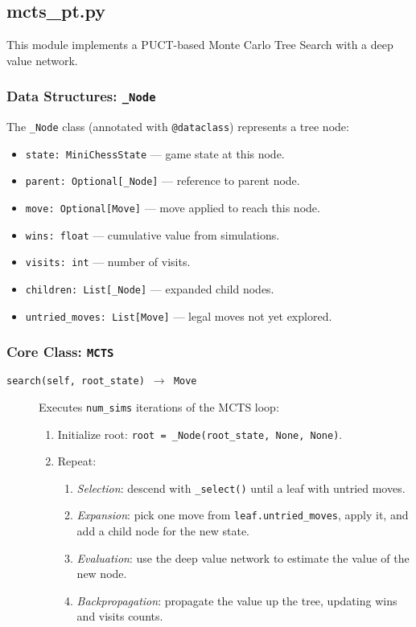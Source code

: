 \documentclass{report}
\begin{document}
\subsection{mcts\_pt.py}
\label{sec:mcts_pt}
This module implements a PUCT-based Monte Carlo Tree Search with a deep value network.

\subsubsection{Data Structures: \texttt{\_Node}}
The \texttt{\_Node} class (annotated with \texttt{@dataclass}) represents a tree node:
\begin{itemize}
  \item \texttt{state: MiniChessState} — game state at this node.
  \item \texttt{parent: Optional[\_Node]} — reference to parent node.
  \item \texttt{move: Optional[Move]} — move applied to reach this node.
  \item \texttt{wins: float} — cumulative value from simulations.
  \item \texttt{visits: int} — number of visits.
  \item \texttt{children: List[\_Node]} — expanded child nodes.
  \item \texttt{untried\_moves: List[Move]} — legal moves not yet explored.
\end{itemize}

\subsubsection{Core Class: \texttt{MCTS}}
\begin{description}
  \item[\texttt{search(self, root\_state) $\to$ Move}] 
    Executes \texttt{num\_sims} iterations of the MCTS loop:
    \begin{enumerate}
      \item Initialize root: \texttt{root = \_Node(root\_state, None, None)}.
      \item Repeat:
        \begin{enumerate}
          \item \emph{Selection}: descend with \texttt{\_select()} until a leaf with untried moves.
          \item \emph{Expansion}: pick one move from \texttt{leaf.untried\_moves}, apply it, and add a child node for the new state.
          \item \emph{Evaluation}: use the deep value network to estimate the value of the new node.
          \item \emph{Backpropagation}: propagate the value up the tree, updating wins and visits counts.
        \end{enumerate}
    \end{enumerate}
\end{description}
 
\end{document}
